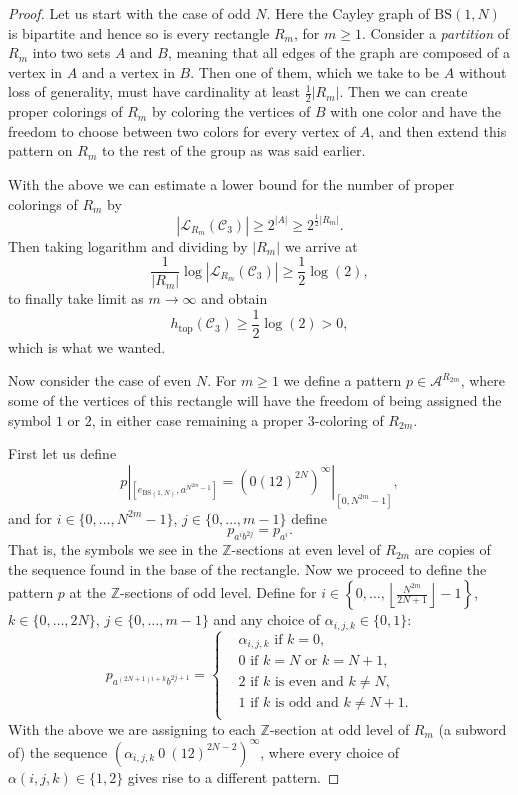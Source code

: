 \documentclass[cupthm,crop,info]{CUP-JNL-ETS}%
\theoremstyle{cupplain}
\theoremstyle{cupdefinition}
\theoremstyle{cupremark}
\theoremstyle{cupproof}
\newtheorem{proof}{Proof}
\numberwithin{equation}{section}
\newcommand{\BS}[1][N]{\mathrm{BS}(1,#1)}
\def\htop{h_{\mathrm{top}}}
\begin{document}
\begin{proof}
	Let us start with the case of odd $N$. Here the Cayley graph of $\BS$ is bipartite and hence so is every rectangle $R_m$, for $m\ge 1$. Consider a \textit{partition} of $R_m$ into two sets $A$ and $B$, meaning that all edges of the graph are composed of a vertex in $A$ and a vertex in $B$. Then one of them, which we take to be $A$ without loss of generality, must have cardinality at least $\frac{1}{2}|R_m|$. Then we can create proper colorings of $R_m$ by coloring the vertices of $B$ with one color and have the freedom to choose between two colors for every vertex of $A$, and then extend this pattern on $R_m$ to the rest of the group as was said earlier.
	
	With the above we can estimate a lower bound for the number of proper colorings of $R_m$ by
	$$
	|\mathcal{L}_{R_m}(\mathcal{C}_3)|\ge 2^{|A|}\ge 2^{\frac{1}{2}|R_m|}.
	$$
	Then taking logarithm and dividing by $|R_m|$ we arrive at
	$$
	\frac{1}{|R_m|}\log |\mathcal{L}_{R_m}(\mathcal{C}_3)| \ge \frac{1}{2}\log (2),
	$$
	to finally take limit as $m\to \infty$ and obtain
	$$
	\htop(\mathcal{C}_3)\ge \frac{1}{2}\log(2)>0,
	$$
	which is what we wanted.
	
	
	Now consider the case of even $N$. For $m\ge 1$ we define a pattern $p\in \mathcal{A}^{R_{2m}}$, where some of the vertices of this rectangle will have the freedom of being assigned the symbol $1$ or $2$, in either case remaining a proper $3$-coloring of $R_{2m}$.
	
	First let us define 
	$$
	p|_{[e_{\BS},a^{N^{2m}-1}]}=\left(0(12)^{2N}\right)^{\infty}|_{[0,N^{2m}-1]},
	$$
	and for $i\in \{0,\ldots, N^{2m}-1 \}$, $j\in \{0,\ldots, m-1 \}$ define
	$$
	p_{a^{i}b^{2j}}=p_{a^i}.
	$$
	That is, the symbols we see in the $\mathbb{Z}$-sections at even level of $R_{2m}$ are copies of the sequence found in the base of the rectangle. Now we proceed to define the pattern $p$ at the $\mathbb{Z}$-sections of odd level. Define for $i\in \left\{0,\ldots, \left\lfloor \frac{N^{2m}}{2N+1}\right\rfloor-1  \right\}$, $k\in \{0,\ldots,2N\}$, $j\in \{0,\ldots,m-1\}$ and any choice of $\alpha_{i,j,k}\in \{0,1\}$:
	\begin{equation*}
	p_{a^{(2N+1)i+k}b^{2j+1}}=\left\{
	\begin{aligned}
	&\alpha_{i,j,k} \text{ if }k=0,\\
	& 0\text{ if }k=N \text{ or }k=N+1,\\
	& 2\text{ if }k\text{ is even and }k\neq N,\\
	& 1\text{ if }k\text{ is odd and }k\neq N+1.\\
	\end{aligned}
	\right.
	\end{equation*}
	With the above we are assigning to each $\mathbb{Z}$-section at odd level of $R_m$ (a subword of) the sequence $\left(\alpha_{i,j,k}\ 0\ (12)^{2N-2}\right)^{\infty}$, where every choice of $\alpha(i,j,k)\in \{1,2\}$ gives rise to a different pattern.
	

\end{proof}
\end{document}
